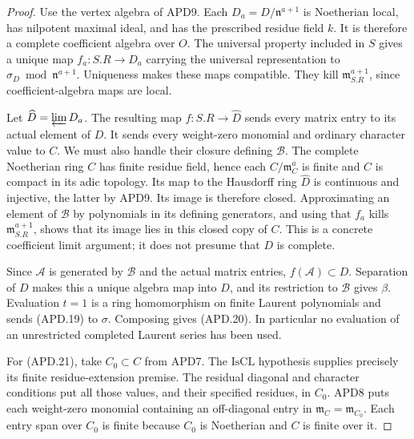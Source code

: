 \documentclass[11pt,a4paper]{article}
\numberwithin{equation}{section}
\theoremstyle{remark}\newtheorem{remark}[theorem]{Remark}
\begin{document}
\begin{proof}
Use the vertex algebra of APD9.  Each
\(D_a=D/\mathfrak n^{a+1}\) is Noetherian local, has nilpotent
maximal ideal, and has the prescribed residue field \(k\).
It is therefore a complete coefficient algebra over \(O\).
The universal property included in \(S\) gives a unique map
\(f_a:S.R\to D_a\) carrying the universal representation to
\(\sigma_D\bmod\mathfrak n^{a+1}\).  Uniqueness makes these
maps compatible.  They kill \(\mathfrak m_{S.R}^{a+1}\), since
coefficient-algebra maps are local.

Let \(\widehat D=\varprojlim D_a\).  The resulting map
\(f:S.R\to\widehat D\) sends every matrix entry to its actual
element of \(D\).  It sends every weight-zero monomial and
ordinary character value to \(C\).  We must also handle their
closure defining \(\mathcal B\).  The complete Noetherian ring
\(C\) has finite residue field, hence each
\(C/\mathfrak m_C^a\) is finite and \(C\) is compact in its
adic topology.  Its map to the Hausdorff ring \(\widehat D\)
is continuous and injective, the latter by APD9.  Its image is
therefore closed.  Approximating an element of \(\mathcal B\)
by polynomials in its defining generators, and using that \(f_a\)
kills \(\mathfrak m_{S.R}^{a+1}\), shows that its image lies
in this closed copy of \(C\).  This is a concrete coefficient
limit argument; it does not presume that \(D\) is complete.

Since \(\mathcal A\) is generated by \(\mathcal B\) and
the actual matrix entries, \(f(\mathcal A)\subset D\).
Separation of \(D\) makes this a unique algebra map into
\(D\), and its restriction to \(\mathcal B\) gives \(\beta\).
Evaluation \(t=1\) is a ring homomorphism on finite Laurent
polynomials and sends (APD.19) to \(\sigma\).  Composing
gives (APD.20).  In particular no evaluation of an unrestricted
completed Laurent series has been used.

For (APD.21), take \(C_0\subset C\) from APD7.  The
\(\mathrm{IsCL}\) hypothesis supplies precisely its finite
residue-extension premise.  The residual diagonal and character
conditions put all those values, and their specified residues,
in \(C_0\).  APD8 puts each weight-zero monomial containing an
off-diagonal entry in \(\mathfrak m_C=\mathfrak m_{C_0}\).
Each entry span over \(C_0\) is finite because \(C_0\) is
Noetherian and \(C\) is finite over it.


\end{proof}
\end{document}
